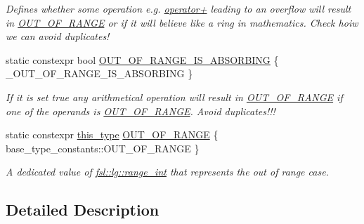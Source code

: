 \begin{DoxyCompactItemize}
\begin{DoxyCompactList}\small\item\em Defines whether some operation e.\+g. \mbox{\hyperlink{classfsl_1_1lg_1_1range__int_a61dfb1dc667dbb7afefa10680749c8e4}{operator+}} leading to an overflow will result in \mbox{\hyperlink{classfsl_1_1lg_1_1range__int_acbcdf600daa56d701bdf215ccfb43ce7}{O\+U\+T\+\_\+\+O\+F\+\_\+\+R\+A\+N\+GE}} or if it will believe like a ring in mathematics. Check hoiw we can avoid duplicates! \end{DoxyCompactList}\item 
\mbox{\label{classfsl_1_1lg_1_1range__int_acbf06ac41ab787737c754e77726b7354}} 
static constexpr bool \mbox{\hyperlink{classfsl_1_1lg_1_1range__int_acbf06ac41ab787737c754e77726b7354}{O\+U\+T\+\_\+\+O\+F\+\_\+\+R\+A\+N\+G\+E\+\_\+\+I\+S\+\_\+\+A\+B\+S\+O\+R\+B\+I\+NG}} \{ \+\_\+\+O\+U\+T\+\_\+\+O\+F\+\_\+\+R\+A\+N\+G\+E\+\_\+\+I\+S\+\_\+\+A\+B\+S\+O\+R\+B\+I\+NG \}
\begin{DoxyCompactList}\small\item\em If it is set true any arithmetical operation will result in \mbox{\hyperlink{classfsl_1_1lg_1_1range__int_acbcdf600daa56d701bdf215ccfb43ce7}{O\+U\+T\+\_\+\+O\+F\+\_\+\+R\+A\+N\+GE}} if one of the operands is \mbox{\hyperlink{classfsl_1_1lg_1_1range__int_acbcdf600daa56d701bdf215ccfb43ce7}{O\+U\+T\+\_\+\+O\+F\+\_\+\+R\+A\+N\+GE}}. Avoid duplicates!!! \end{DoxyCompactList}\item 
\mbox{\label{classfsl_1_1lg_1_1range__int_acbcdf600daa56d701bdf215ccfb43ce7}} 
static constexpr \mbox{\hyperlink{classfsl_1_1lg_1_1range__int_a169bb31424f54af669b39a96e42dc73f}{this\+\_\+type}} \mbox{\hyperlink{classfsl_1_1lg_1_1range__int_acbcdf600daa56d701bdf215ccfb43ce7}{O\+U\+T\+\_\+\+O\+F\+\_\+\+R\+A\+N\+GE}} \{ base\+\_\+type\+\_\+constants\+::\+O\+U\+T\+\_\+\+O\+F\+\_\+\+R\+A\+N\+GE \}
\begin{DoxyCompactList}\small\item\em A dedicated value of \mbox{\hyperlink{classfsl_1_1lg_1_1range__int}{fsl\+::lg\+::range\+\_\+int}} that represents the out of range case. \end{DoxyCompactList}\end{DoxyCompactItemize}


\subsection{Detailed Description}
